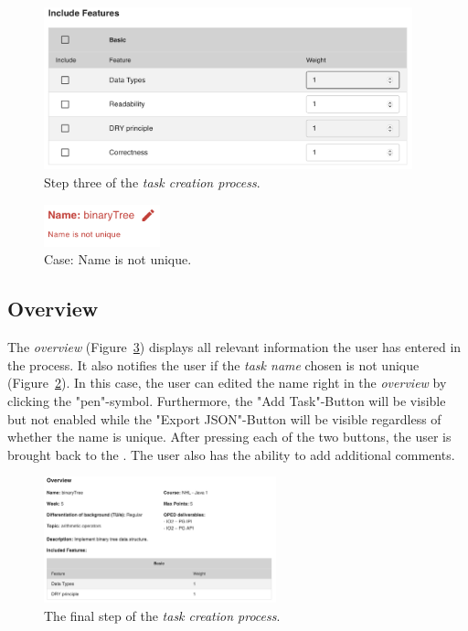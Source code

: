 \begin{figure}[h]
  \begin{center}
    \includegraphics[width=0.95\textwidth]{figures/features}
  \end{center}
  \caption{Step three of the \textit{task creation process}.}
  \label{fig:features}
\end{figure}

\begin{figure}
    \includegraphics[width=0.3\textwidth]{figures/namenotunique}
  \caption{Case: Name is not unique.}
  \label{fig:namenotunique}
\end{figure}


\subsection{Overview}
The \textit{overview} (Figure~\ref{fig:overview}) displays all relevant information the user has entered in the process. It also notifies the user if the \textit{task name} chosen is not unique (Figure~\ref{fig:namenotunique}). In this case, the user can edited the name right in the \textit{overview} by clicking the "pen"-symbol. Furthermore, the "Add Task"-Button will be visible but not enabled while the "Export JSON"-Button will be visible regardless of whether the name is unique. After pressing each of the two buttons, the user is brought back to the .
The user also has the ability to add additional comments.


\begin{figure}[h]
  \begin{center}
    \includegraphics[width=0.6\textwidth]{figures/overview}
  \end{center}
  \caption{The final step of the \textit{task creation process}.}
  \label{fig:overview}
\end{figure}




